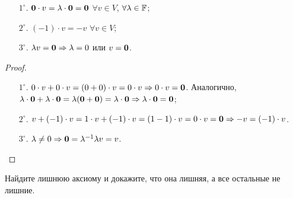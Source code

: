 \begin{proposal}
    \begin{enumerate}[nolistsep]
        \item[$1^\circ.$] $\boldsymbol{0} \cdot v = \lambda \cdot \boldsymbol{0} = \boldsymbol{0}$ $\forall v \in V$, $\forall \lambda \in \mathbb{F}$;
        \item[$2^\circ.$] $(-1) \cdot v = -v$ $\forall v \in V$;
        \item[$3^\circ.$] $\lambda v = \boldsymbol{0} \Rightarrow \lambda = 0$ или $v = \boldsymbol{0}$.
    \end{enumerate}
\end{proposal}

\begin{proof}
    \begin{enumerate}[nolistsep]
        \item[$1^\circ.$] $0 \cdot v + 0 \cdot v = (0 + 0) \cdot v = 0 \cdot v \Rightarrow 0 \cdot v = \boldsymbol{0}$. Аналогично, $\lambda \cdot \boldsymbol{0} + \lambda \cdot \boldsymbol{0} = \lambda(\boldsymbol{0} + \boldsymbol{0}) = \lambda \cdot \boldsymbol{0} \Rightarrow \lambda \cdot \boldsymbol{0} = \boldsymbol{0}$;
        \item[$2^\circ.$] $v + (-1) \cdot v = 1 \cdot v + (-1) \cdot v = (1 - 1) \cdot v = 0 \cdot v = \boldsymbol{0} \Rightarrow -v = (-1) \cdot v$.
        \item[$3^\circ.$] $\lambda \ne 0 \Rightarrow \boldsymbol{0} = \lambda^{-1}\lambda v = v$.
    \end{enumerate}
\end{proof}

\begin{problem}
    Найдите лишнюю аксиому и докажите, что она лишняя, а все остальные не лишние.
\end{problem}


